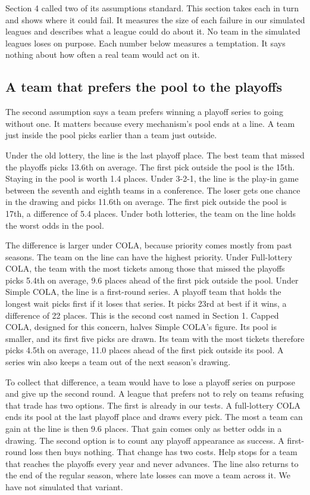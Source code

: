 \documentclass[11pt,letterpaper]{article}
\begin{document}
Section 4 called two of its assumptions standard. This section takes each in turn and shows where it could fail. It measures the size of each failure in our simulated leagues and describes what a league could do about it. No team in the simulated leagues loses on purpose. Each number below measures a temptation. It says nothing about how often a real team would act on it.

\subsection{A team that prefers the pool to the playoffs}

The second assumption says a team prefers winning a playoff series to going without one. It matters because every mechanism's pool ends at a line. A team just inside the pool picks earlier than a team just outside.

Under the old lottery, the line is the last playoff place. The best team that missed the playoffs picks 13.6th on average. The first pick outside the pool is the 15th. Staying in the pool is worth 1.4 places. Under 3-2-1, the line is the play-in game between the seventh and eighth teams in a conference. The loser gets one chance in the drawing and picks 11.6th on average. The first pick outside the pool is 17th, a difference of 5.4 places. Under both lotteries, the team on the line holds the worst odds in the pool.

The difference is larger under COLA, because priority comes mostly from past seasons. The team on the line can have the highest priority. Under Full-lottery COLA, the team with the most tickets among those that missed the playoffs picks 5.4th on average, 9.6 places ahead of the first pick outside the pool. Under Simple COLA, the line is a first-round series. A playoff team that holds the longest wait picks first if it loses that series. It picks 23rd at best if it wins, a difference of 22 places. This is the second cost named in Section 1. Capped COLA, designed for this concern, halves Simple COLA's figure. Its pool is smaller, and its first five picks are drawn. Its team with the most tickets therefore picks 4.5th on average, 11.0 places ahead of the first pick outside its pool. A series win also keeps a team out of the next season's drawing.

To collect that difference, a team would have to lose a playoff series on purpose and give up the second round. A league that prefers not to rely on teams refusing that trade has two options. The first is already in our tests. A full-lottery COLA ends its pool at the last playoff place and draws every pick. The most a team can gain at the line is then 9.6 places. That gain comes only as better odds in a drawing. The second option is to count any playoff appearance as success. A first-round loss then buys nothing. That change has two costs. Help stops for a team that reaches the playoffs every year and never advances. The line also returns to the end of the regular season, where late losses can move a team across it. We have not simulated that variant.
\end{document}

